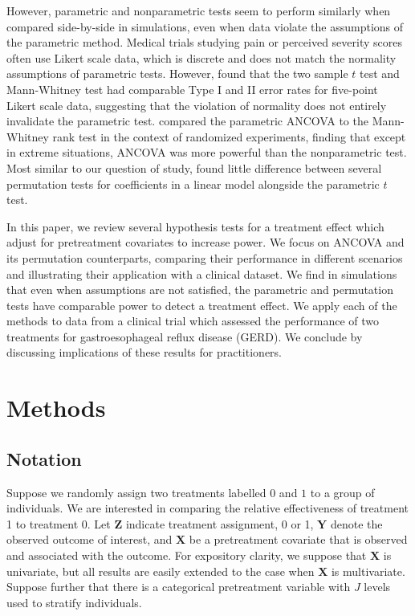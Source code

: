 \documentclass[12pt]{article}
\begin{document}
However, parametric and nonparametric tests seem to perform similarly when compared side-by-side in simulations, even when data violate the assumptions of the parametric method.
Medical trials studying pain or perceived severity scores often use Likert scale data, which is discrete and does not match the normality assumptions of parametric tests.
However, \cite{winter_five-point_2010} found that the two sample $t$ test and Mann-Whitney test had comparable Type I and II error rates for five-point Likert scale data, suggesting that the violation of normality does not entirely invalidate the parametric test.
\cite{vickers_parametric_2005} compared the parametric ANCOVA to the Mann-Whitney rank test in the context of randomized experiments, finding that except in extreme situations, ANCOVA was more powerful than the nonparametric test.
Most similar to our question of study, \cite{anderson_empirical_1999} found little difference between several permutation tests for coefficients in a linear model alongside the parametric $t$ test.

In this paper, we review several hypothesis tests for a treatment effect which adjust for pretreatment covariates to increase power.  
We focus on ANCOVA and its permutation counterparts, comparing their performance in different scenarios and illustrating their application with a clinical dataset.
We find in simulations that even when assumptions are not satisfied, the parametric and permutation tests have comparable power to detect a treatment effect.
We apply each of the methods to data from a clinical trial which assessed the performance of two treatments for gastroesophageal reflux disease (GERD).
We conclude by discussing implications of these results for practitioners.

\section{Methods}


\subsection{Notation}
Suppose we randomly assign two treatments labelled $0$ and $1$ to a group of individuals.
We are interested in comparing the relative effectiveness of treatment 1 to treatment 0.
Let $\mathbf{Z}$ indicate treatment assignment, 0 or 1, 
$\mathbf{Y}$ denote the observed outcome of interest,
and $\mathbf{X}$ be a pretreatment covariate that is observed and associated with the outcome.
For expository clarity, we suppose that $\mathbf{X}$ is univariate, but all results are easily extended to the case when $\mathbf{X}$ is multivariate.
Suppose further that there is a categorical pretreatment variable with $J$ levels used to stratify individuals. 
\end{document}
